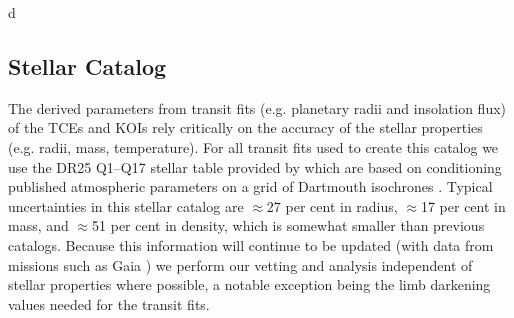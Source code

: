 d\subsection{Stellar Catalog}
The derived parameters from transit fits (e.g. planetary radii and insolation flux) of the TCEs and KOIs rely critically on the accuracy of the stellar properties (e.g. radii, mass, temperature).   For all transit fits used to create this catalog we use the DR25 Q1--Q17 stellar table provided by \citet{Mathur2017} which are based on conditioning published atmospheric parameters on a grid of Dartmouth isochrones \citep{Dotter2008}.  Typical uncertainties in this stellar catalog are $\approx$27 per cent in radius, $\approx$17 per cent in mass, and $\approx$51 per cent in density, which is somewhat smaller than previous catalogs. Because this information will continue to be updated (with data from missions such as Gaia \citep{Gaia2016}) we perform our vetting and analysis independent of stellar properties where possible, a notable exception being the limb darkening values needed for the transit fits.